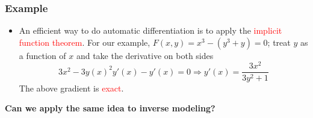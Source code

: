 \documentclass[usenames,dvipsnames]{beamer}
\begin{document}
\begin{frame}
	\frametitle{Example}

	\begin{itemize}
		\item An efficient way to do automatic differentiation is to apply the \textcolor{red}{implicit function theorem}. For our example, $F(x,y)=x^3-(y^3+y)=0$; treat $y$ as a function of $x$ and take the derivative on both sides
		      $$3x^2 - 3y(x)^2y'(x)-y'(x)=0\Rightarrow y'(x) = \frac{3x^2}{3y^2+1}$$
		      The above gradient is \textcolor{red}{exact}.
	\end{itemize}
	\begin{center}
		\textbf{Can we apply the same idea to inverse modeling?}
	\end{center}

\end{frame}
\end{document}
